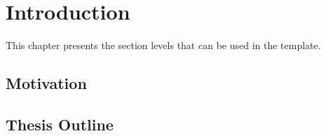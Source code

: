 \chapter{Introduction}
This chapter presents the section levels that can be used in the template. 

\section{Motivation}
\section{Thesis Outline}


